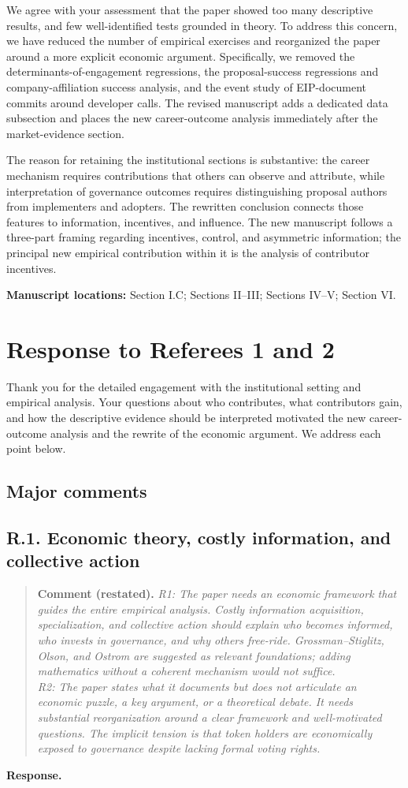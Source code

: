 \documentclass[11pt,letterpaper]{article}
\newcommand{\point}[3]{%
  \Needspace{7\baselineskip}
  \subsection*{#1. #2}\phantomsection\label{pt:#1}%
  \begin{quote}\small\textbf{Comment (restated).} \textit{#3}\end{quote}%
  \textbf{Response.}\enspace\ignorespaces}
\newcommand{\locations}[1]{\par{\small\textbf{Manuscript locations:} #1.}\par}
\begin{document}
We agree with your assessment that the paper showed too many descriptive results, and few well-identified tests grounded in theory. To address this concern, we have reduced the number of empirical exercises and reorganized the paper around a more explicit economic argument. Specifically, we removed the determinants-of-engagement regressions, the proposal-success regressions and company-affiliation success analysis, and the event study of EIP-document commits around developer calls. The revised manuscript adds a dedicated data subsection and places the new career-outcome analysis immediately after the market-evidence section.

The reason for retaining the institutional sections is substantive: the career mechanism requires contributions that others can observe and attribute, while interpretation of governance outcomes requires distinguishing proposal authors from implementers and adopters. The rewritten conclusion connects those features to information, incentives, and influence. The new manuscript follows a three-part framing regarding incentives, control, and asymmetric information; the principal new empirical contribution within it is the analysis of contributor incentives.

\locations{Section I.C; Sections II--III; Sections IV--V; Section VI}

\clearpage
\section*{Response to Referees 1 and 2}

Thank you for the detailed engagement with the institutional setting and empirical analysis. Your questions about who contributes, what contributors gain, and how the descriptive evidence should be interpreted motivated the new career-outcome analysis and the rewrite of the economic argument. We address each point below.

\subsection*{Major comments}

\point{R.1}{Economic theory, costly information, and collective action}{R1: The paper needs an economic framework that guides the entire empirical analysis. Costly information acquisition, specialization, and collective action should explain who becomes informed, who invests in governance, and why others free-ride. Grossman--Stiglitz, Olson, and Ostrom are suggested as relevant foundations; adding mathematics without a coherent mechanism would not suffice. \\
R2: The paper states what it documents but does not articulate an economic puzzle, a key argument, or a theoretical debate. It needs substantial reorganization around a clear framework and well-motivated questions. The implicit tension is that token holders are economically exposed to governance despite lacking formal voting rights.}
\end{document}
